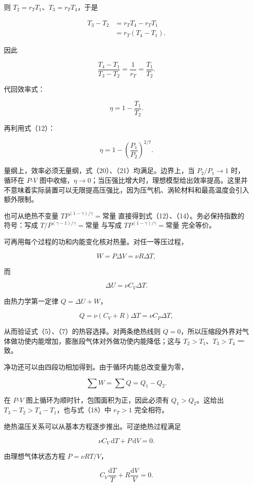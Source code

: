 \documentclass[12pt,a4paper,UTF8]{ctexart}
\begin{document}
则 \(T_2=r_TT_1\)、\(T_3=r_TT_4\)，于是

\[
\begin{aligned}
T_3-T_2
&=r_TT_4-r_TT_1\\
&=r_T(T_4-T_1).
\end{aligned} \tag{18}
\]

因此

\[
\frac{T_4-T_1}{T_3-T_2}=\frac1{r_T}=\frac{T_1}{T_2}. \tag{19}
\]

代回效率式：

\[
\boxed{\eta=1-\frac{T_1}{T_2}}. \tag{20}
\]

再利用式（12）：

\[
\boxed{\eta=1-\left(\frac{P_1}{P_2}\right)^{2/7}}. \tag{21}
\]

量纲上，效率必须无量纲，式（20）、（21）均满足。边界上，当
\(P_2/P_1\to1\) 时，循环在 \(P\)-\(V\)
图中收缩，\(\eta\to0\)；当压强比增大时，理想模型给出效率提高。这里并不意味着实际装置可以无限提高压强比，因为压气机、涡轮材料和最高温度会引入额外限制。

也可从绝热不变量 \(TP^{(1-\gamma)/\gamma}=\text{常量}\)
直接得到式（12）、（14）。务必保持指数的符号：写成
\(T/P^{(\gamma-1)/\gamma}=\text{常量}\) 与写成
\(TP^{(1-\gamma)/\gamma}=\text{常量}\) 完全等价。

可再用每个过程的功和内能变化核对热量。对任一等压过程，

\[
W=P\Delta V=\nu R\Delta T,
\]

而

\[
\Delta U=\nu C_V\Delta T.
\]

由热力学第一定律 \(Q=\Delta U+W\)，

\[
Q=\nu(C_V+R)\Delta T=\nu C_P\Delta T,
\]

从而验证式（5）、（7）的热容选择。对两条绝热线则
\(Q=0\)，所以压缩段外界对气体做功使内能增加，膨胀段气体对外做功使内能降低；这与
\(T_2>T_1\)、\(T_3>T_4\) 一致。

净功还可以由四段功相加得到。由于循环内能总改变量为零，

\[
\sum W=\sum Q=Q_1-Q_2.
\]

在 \(P\)-\(V\) 图上循环为顺时针，包围面积为正，因此必须有
\(Q_1>Q_2\)。这给出 \(T_3-T_2>T_4-T_1\)，也与式（18）中 \(r_T>1\)
完全相符。

绝热温压关系可以从基本方程逐步推出。可逆绝热过程满足

\[
\nu C_V\,\mathrm dT+P\,\mathrm dV=0.
\]

由理想气体状态方程 \(P=\nu RT/V\)，

\[
C_V\frac{\mathrm dT}{T}+R\frac{\mathrm dV}{V}=0.
\]
\end{document}
